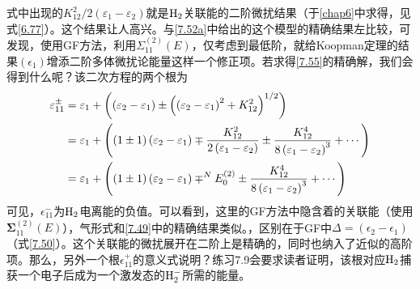 式中出现的${K_{12}^{2}}/{2\left(\varepsilon_{1}-\varepsilon_{2}\right)}$就是$\mathrm{H}_2$关联能的二阶微扰结果（于\ref{chap6}中求得，见式\eqref{6.77}）。这个结果让人高兴。与\eqref{7.52a}中给出的这个模型的精确结果左比较，可发现，使用GF方法，利用$\Sigma_{11}^{(2)}(E)$，仅考虑到最低阶，就给Koopman定理的结果$(\epsilon_1)$增添二阶多体微扰论能量这样一个修正项。若求得\eqref{7.55}的精确解，我们会得到什么呢？该二次方程的两个根为
\begin{align}
\varepsilon_{11}^{\pm} &=\varepsilon_{1}+\left(\left(\varepsilon_{2}-\varepsilon_{1}\right) \pm\left(\left(\varepsilon_{2}-\varepsilon_{1}\right)^{2}+K_{12}^{2}\right)^{1 / 2}\right) \notag\\
&=\varepsilon_{1}+\left((1 \pm 1)\left(\varepsilon_{2}-\varepsilon_{1}\right) \mp \frac{K_{12}^{2}}{2\left(\varepsilon_{1}-\varepsilon_{2}\right)} \pm \frac{K_{12}^{4}}{8\left(\varepsilon_{1}-\varepsilon_{2}\right)^{3}}+\cdots\right) \notag\\
&=\varepsilon_{1}+\left((1 \pm 1)\left(\varepsilon_{2}-\varepsilon_{1}\right) \mp^{N} E_{0}^{(2)} \pm \frac{K_{12}^{4}}{8\left(\varepsilon_{1}-\varepsilon_{2}\right)^{3}}+\cdots\right)
\end{align}
可见，$\epsilon_{11}^-$为$\mathrm{H}_2$电离能的负值。可以看到，这里的GF方法中隐含着的关联能（使用$\mathbf{\Sigma}_{11}^{(2)}(E)$），气形式和\eqref{7.49}中的精确结果类似。，区别在于GF中$\Delta=(\epsilon_{2}-\epsilon_1)$（式\eqref{7.50}）。这个关联能的微扰展开在二阶上是精确的，同时也纳入了近似的高阶项。那么，另外一个根$\epsilon_{11}^+$的意义式说明？练习7.9会要求读者证明，该根对应$\mathrm{H}_2$捕获一个电子后成为一个激发态的$\mathrm{H}_2^-$所需的能量。
